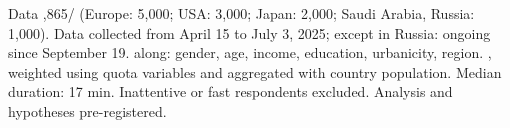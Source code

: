 \documentclass[aspectratio=169,xcolor=dvipsnames, 11pt,mathserif]{beamer}
\begin{document}

\begin{frame}{Data\label{data}}
  \vspace{.1cm}
 \vspace{-.5cm}
\bbvs
{},865/ (Europe: 5,000; USA: 3,000; Japan: 2,000; Saudi Arabia, Russia: 1,000).
\ip Data collected from April 15 to July 3, 2025; except in Russia: ongoing since September 19.
\ip {} along: gender, age, income, education, urbanicity, region. \hyperlink{representativeness}{} 
\ip {}, weighted using quota variables and aggregated with country population.
\ip Median duration: 17 min. Inattentive or fast respondents excluded.
\ip Analysis and hypotheses pre-registered.
\ee
\end{frame}
\end{document}
